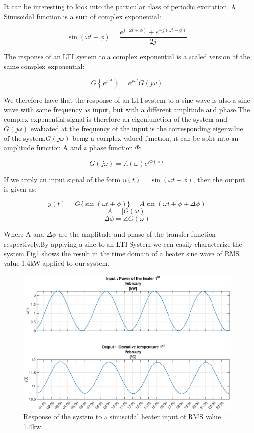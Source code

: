 \documentclass[a4paper,12pt]{article}
\numberwithin{equation}{section}
\begin{document}
It can be interesting to look into the particular class of periodic excitation. A Sinusoidal function is a sum of complex exponential:

\[\sin (\omega t+\phi)=\frac{e^{j(\omega t+\phi)}+e^{-j(\omega t+\phi)}}{2 j}\]

The response of an LTI system to a complex exponential  is a scaled version of the same complex
exponential:

\[G\left\{e^{j \omega t}\right\}=e^{j \omega t} G(j \omega)\]

We therefore have that the response of an LTI system to a sine wave is also a sine wave  with same
frequency as input, but with a different amplitude and phase.The complex exponential signal is therefore an eigenfunction of the system and $G(j \omega)$ evaluated at the frequency of the input is the corresponding eigenvalue of the system.$G(j \omega)$ being a complex-valued function, it can be split into an amplitude function A and a phase function $\Phi$:

\[G(j \omega)=A(\omega) e^{j \Phi(\omega)}\]

If we apply an input signal of the form $u(t)=\sin (\omega t+\phi)$, then the output is given as:


\[y(t)=G\{\sin (\omega t+\phi)\} =A \sin (\omega t+\phi+\Delta \phi)\]
\[A =|G(\omega)| \]
\[\Delta \phi =\angle G(\omega)\]

Where A and $\Delta \phi$ are  the amplitude  and phase of the transfer function respectively.By applying a sine to an LTI System we can easily characterize the system.Fig\ref{fig:single sine} shows the result in the time domain of a heater sine wave of RMS value 1.4kW applied to our system.

\begin{figure}[H]
    \includegraphics[scale=0.7]{single_sine_rms_1400.eps}
    \caption{Response of the system to a sinusoidal heater input of RMS value 1.4kw}
    \label{fig:single sine}
\end{figure}
\end{document}
